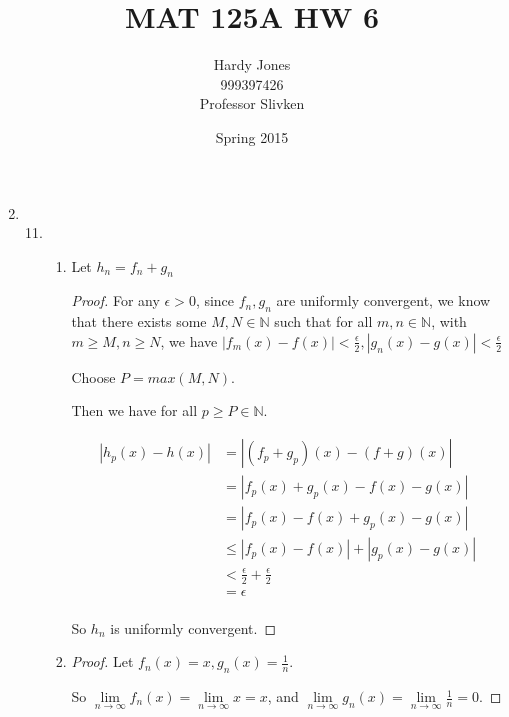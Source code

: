 \documentclass[12pt,letterpaper]{article}
\title{MAT 125A HW 6\vspace{-2ex}}
\author{Hardy Jones\\
        999397426\\
        Professor Slivken\vspace{-2ex}}
\date{Spring 2015}
\begin{document}
  \maketitle

  \begin{enumerate}
    \setcounter{enumi}{1}
    \item
      \begin{enumerate}
        \setcounter{enumii}{10}
        \item
          \begin{enumerate}
            \item
              Let $h_n = f_n + g_n$
              \begin{proof}
                For any $\epsilon > 0$,
                since $f_n, g_n$ are uniformly convergent,
                we know that there exists some $M, N \in \mathbb{N}$ such that
                for all $m, n \in \mathbb{N}$, with $m \geq M, n \geq N$,
                we have $\left|f_m(x) - f(x)\right| < \frac{\epsilon}{2}, \left|g_n(x) - g(x)\right| < \frac{\epsilon}{2}$

                Choose $P = max(M, N)$.

                Then we have for all $p \geq P \in \mathbb{N}$.

                \begin{align*}
                  \left|h_p(x) - h(x)\right|
                  &= \left|\left(f_p + g_p\right)(x) - \left(f + g\right)(x)\right| \\
                  &= \left|f_p(x) + g_p(x) - f(x) - g(x)\right| \\
                  &= \left|f_p(x) - f(x) + g_p(x) - g(x)\right| \\
                  &\leq \left|f_p(x) - f(x)\right| + \left|g_p(x) - g(x)\right| \\
                  &< \frac{\epsilon}{2} + \frac{\epsilon}{2} \\
                  &= \epsilon \\
                \end{align*}

                So $h_n$ is uniformly convergent.
              \end{proof}
            \item
              \begin{proof}
                Let $f_n(x) = x, g_n(x) = \frac{1}{n}$.

                So $\lim\limits_{n \to \infty}f_n(x) = \lim\limits_{n \to \infty}x = x$,
                and $\lim\limits_{n \to \infty}g_n(x) = \lim\limits_{n \to \infty}\frac{1}{n} = 0$.


\end{proof}
\end{enumerate}
\end{enumerate}
\end{enumerate}
\end{document}
